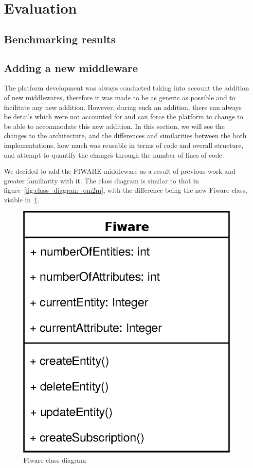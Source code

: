 \documentclass[conference]{IEEEtran}
\begin{document}
\section{Evaluation}

\subsection{Benchmarking results}

\subsection{Adding a new middleware}

The platform development was always conducted taking into account the addition of new middlewares, therefore it was made to be as generic as possible and to facilitate any new addition. However, during such an addition, there can always be details which were not accounted for and can force the platform to change to be able to accommodate this new addition. In this section, we will see the changes to the architecture, and the differences and similarities between the both implementations, how much was reusable in terms of code and overall structure, and attempt to quantify the changes through the number of lines of code. 

We decided to add the FIWARE middleware as a result of previous work and greater familiarity with it. The class diagram is similar to that in figure~\ref{fig:class_diagram_om2m}, with the difference being the new Fiware class, visible in~\ref{fig:class_diagram_fiware}.

\begin{figure}[htbp!]
  \centering
  \includegraphics[width=0.5\columnwidth]{figures/class_diagram_fiware.eps}
  \caption{Fiware class diagram}
  \label{fig:class_diagram_fiware}
\end{figure}
\end{document}
